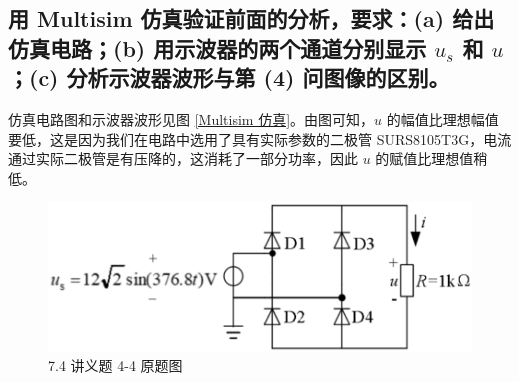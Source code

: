 \documentclass[UTF8]{report}
\theoremstyle{MyLineTheoremStyle} %
\theoremstyle{MyBlockTheoremStyle} %
\theoremstyle{MySubsubsectionStyle} %
\begin{document}
\subsection{用 Multisim 仿真验证前面的分析，要求：(a) 给出仿真电路；(b) 用示波器的两个通道分别显示 $u_s$ 和 $u$；(c) 分析示波器波形与第 (4) 问图像的区别。}

仿真电路图和示波器波形见图 \ref{Multisim 仿真}。由图可知，$u$ 的幅值比理想幅值要低，这是因为我们在电路中选用了具有实际参数的二极管 SURS8105T3G，电流通过实际二极管是有压降的，这消耗了一部分功率，因此 $u$ 的赋值比理想值稍低。

\begin{figure}[H]\centering
\includegraphics[width=0.6\columnwidth]{assets/7/f58e2946a0f20190cc27e51dfb8abb5a.png}
\caption{7.4 讲义题 4-4 原题图}\label{}
\end{figure}
\end{document}
